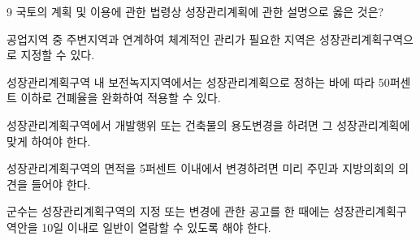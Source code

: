 \begin{question}{9}
국토의 계획 및 이용에 관한 법령상 성장관리계획에 관한 설명으로 옳은 것은?
\begin{choices}
  \item 공업지역 중 주변지역과 연계하여 체계적인 관리가 필요한 지역은 성장관리계획구역으로 지정할 수 있다.
  \item 성장관리계획구역 내 보전녹지지역에서는 성장관리계획으로 정하는 바에 따라 50퍼센트 이하로 건폐율을 완화하여 적용할 수 있다.
  \item 성장관리계획구역에서 개발행위 또는 건축물의 용도변경을 하려면 그 성장관리계획에 맞게 하여야 한다.
  \item 성장관리계획구역의 면적을 5퍼센트 이내에서 변경하려면 미리 주민과 지방의회의 의견을 들어야 한다.
  \item 군수는 성장관리계획구역의 지정 또는 변경에 관한 공고를 한 때에는 성장관리계획구역안을 10일 이내로 일반이 열람할 수 있도록 해야 한다.
\end{choices}
\end{question}
